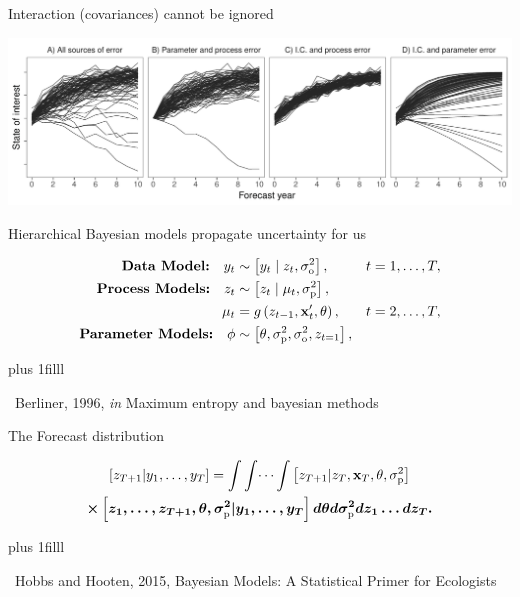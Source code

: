 \documentclass[14pt, compress, aspectratio=1610]{beamer}
\newcommand{\btVFill}{\vskip0pt plus 1filll}
\newcommand{\credit}[1]{\btVFill\par\hfill \footnotesize ~#1}
\begin{document}
\begin{frame}{%
\protect\hypertarget{interaction-covariances-cannot-be-ignored-1}{%
Interaction (covariances) cannot be ignored}}

\centering

\includegraphics[width=\textwidth]{./figures/forecast_uncertainty_example.pdf}

\end{frame}

\begin{frame}{%
\protect\hypertarget{hierarchical-bayesian-models-propagate-uncertainty-for-us}{%
Hierarchical Bayesian models propagate uncertainty for us}}

\begin{equation*}
\begin{aligned}[b]
\textbf{Data Model:} \quad y_t &\sim \left[y_t \;|\; z_t, \sigma^2_{\text{o}}\right], &t = 1,\dots,T, \\ 
\textbf{Process Models:} \quad z_t &\sim \left[z_t \;|\; \mu_t, \sigma^2_{\text{p}}\right],  \\ 
\mu_t &= g \left(z_{t-1},\textbf{x}'_t, \boldmath{\theta} \right), &t = 2,\dots,T, \\ 
\textbf{Parameter Models:} \quad \boldmath{\phi} &\sim \left[\boldmath{\theta},\sigma^2_{\text{p}},\sigma^2_{\text{o}},z_{t=1} \right],
\end{aligned}
\end{equation*}

\credit{Berliner, 1996, \emph{in} Maximum entropy and bayesian methods}

\end{frame}

\begin{frame}{%
\protect\hypertarget{the-forecast-distribution}{%
The Forecast distribution}}

\begin{equation}
\begin{gathered}
\left[z_{T+1} | y_1,\dots,y_T \right] = \int \int \dots \int \left[z_{T+1} | z_T, \textbf{x}_T, \boldmath{\theta}, \sigma^2_{\text{p}} \right] \\ \times \left[z_1,\dots,z_{T+1},\boldmath{\theta}, \sigma^2_{\text{p}} | y_1,\dots,y_T \right] d \boldmath{\theta} d\sigma^2_{\text{p}} dz_1 \dots dz_T.
\end{gathered}
\end{equation}

\credit{Hobbs and Hooten, 2015, Bayesian Models: A Statistical Primer for Ecologists}

\end{frame}
\end{document}
